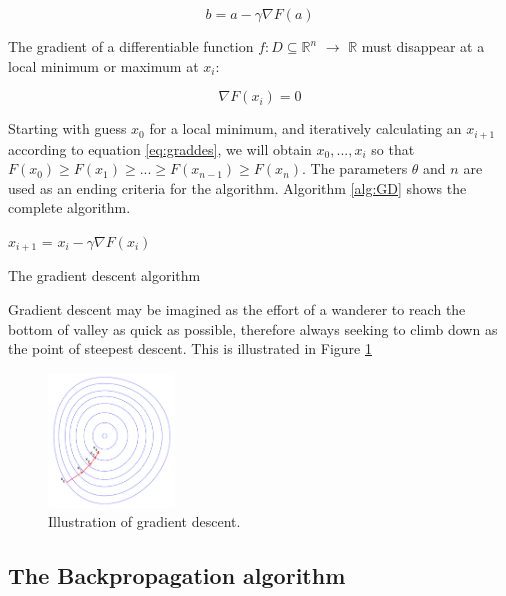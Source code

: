 \documentclass[10pt,a4paper,DIV=11]{scrreprt}
\begin{document}
\begin{equation}
 b = a - \gamma \nabla F(a)
\label{eq:graddes}
\end{equation} 

The gradient of a differentiable function $f: D \subseteq \mathds{R}^n$ $\rightarrow$ $\mathds{R}$ must disappear at a local minimum or maximum at $x_i$:\cite{MATHINF}

\begin{equation}
\nabla F(x_i) = 0
\end{equation} 

Starting with guess $x_0$ for a local minimum, and iteratively calculating an $x_{i+1}$ according to equation \eqref{eq:graddes}, we will obtain $x_0, ..., x_i$ so that $F(x_0) \geq F(x_1) \geq ... \geq F(x_{n-1}) \geq F(x_n)$. The parameters $\theta$ and $n$ are  used as an ending criteria for the algorithm. Algorithm \ref{alg:GD} shows the complete algorithm.

\begin{algorithm}
\LinesNumbered
\DontPrintSemicolon
\BlankLine
{}
\BlankLine
\Begin
{
    {
        $x_{i+1}$ = $x_i - \gamma \nabla F(x_i)$
    }
}
\caption{The gradient descent algorithm}
\label{alg:GD}
\end{algorithm}

Gradient descent may be imagined as the effort of a wanderer to reach the bottom of valley as quick as possible, therefore always seeking to climb down as the point of steepest descent. This is illustrated in Figure \ref{fig:grad}

\begin{figure}
    \centering
    \includegraphics[width=0.3\textwidth,scale=1]{files/graddes.png}  
    \caption{Illustration of gradient descent.}%
    \label{fig:grad}
\end{figure}

\subsection{The Backpropagation algorithm}
\end{document}
